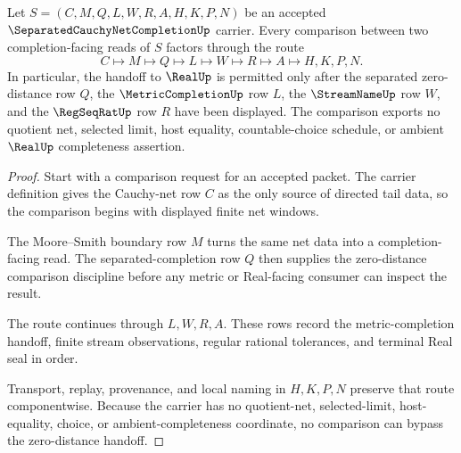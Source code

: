 \begin{theorem}
\label{thm:separated-cauchy-net-completion-zero-distance-handoff}
Let $S=(C,M,Q,L,W,R,A,H,K,P,N)$ be an accepted $\SeparatedCauchyNetCompletionUp$ carrier. Every comparison between two completion-facing reads of $S$ factors through the route
$$
C\longmapsto M\longmapsto Q\longmapsto L\longmapsto W\longmapsto R\longmapsto A\longmapsto H,K,P,N .
$$
In particular, the handoff to $\RealUp$ is permitted only after the separated zero-distance row $Q$, the $\MetricCompletionUp$ row $L$, the $\StreamNameUp$ row $W$, and the $\RegSeqRatUp$ row $R$ have been displayed. The comparison exports no quotient net, selected limit, host equality, countable-choice schedule, or ambient $\RealUp$ completeness assertion.
\end{theorem}
\begin{proof}
Start with a comparison request for an accepted packet. The carrier definition gives the Cauchy-net row $C$ as the only source of directed tail data, so the comparison begins with displayed finite net windows.

The Moore--Smith boundary row $M$ turns the same net data into a completion-facing read. The separated-completion row $Q$ then supplies the zero-distance comparison discipline before any metric or Real-facing consumer can inspect the result.

The route continues through $L,W,R,A$. These rows record the metric-completion handoff, finite stream observations, regular rational tolerances, and terminal Real seal in order.

Transport, replay, provenance, and local naming in $H,K,P,N$ preserve that route componentwise. Because the carrier has no quotient-net, selected-limit, host-equality, choice, or ambient-completeness coordinate, no comparison can bypass the zero-distance handoff.
\end{proof}



